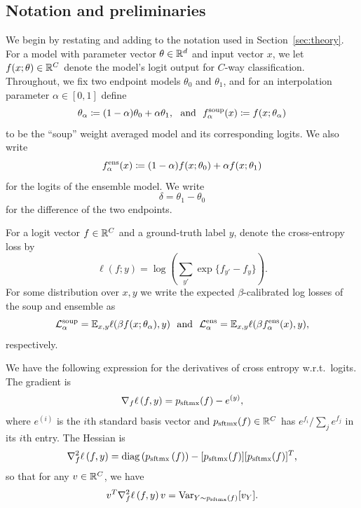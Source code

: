 \newcommand{\ones}{\mathbf{1}}
\newcommand{\sbv}[1]{e^{(#1)}}

\subsection{Notation and preliminaries}
We begin by restating and adding to the notation used in Section~\ref{sec:theory}.
For a model with parameter vector $\theta\in\mathbb{R}^d$ and input vector $x$, we let $f(x;\theta)\in\mathbb{R}^C$ denote the model's logit output for $C$-way classification. Throughout, we fix two endpoint models $\theta_0$ and $\theta_1$, and for an interpolation parameter $\alpha\in[0,1]$ define
\begin{equation*}
	\theta_\alpha \coloneqq (1-\alpha) \theta_0 + \alpha \theta_1,
	~~\mbox{and}~~
	f_\alpha^{\mathrm{soup}}(x) \coloneqq f(x; \theta_\alpha)
\end{equation*}
to be the ``soup'' weight averaged model and its corresponding logits. We also write
\begin{equation*}
	f_\alpha^{\mathrm{ens}}(x) \coloneqq (1-\alpha)f(x;\theta_0) + \alpha f(x;\theta_1)
\end{equation*}
for the logits of the ensemble model. We write
\begin{equation*}
	\delta = \theta_1 - \theta_0
\end{equation*}
for the difference of the two endpoints.

For a logit vector $f\in\mathbb{R}^C$ and a ground-truth label $y$, denote the cross-entropy loss by
\begin{equation*}
	\ell(f;y) = \log\left(\sum_{y'}\exp\{f_{y'}-f_{y}\}\right).
\end{equation*}
For some distribution over $x,y$ we write the expected $\beta$-calibrated log losses of the soup and ensemble as
\begin{equation*}
	\mathcal{L}^{\mathrm{soup}}_\alpha = \mathbb{E}_{x,y} \ell(\beta f(x;\theta_\alpha),y)
	~~\mbox{and}~~
	\mathcal{L}^{\mathrm{ens}}_\alpha = \mathbb{E}_{x,y} \ell(\beta f_\alpha^{\mathrm{ens}}(x),y),
\end{equation*}
respectively.

We have the following expression for the derivatives of cross entropy w.r.t.\ logits. The gradient is
\[
\grad_{f}\ell\left(f,y\right)=\softmax(f) - \sbv{y},
\]
where $\sbv{i}$ is the $i$th standard basis vector and $p_\mathrm{sftmx}(f)\in\mathbb{R}^C$ has $e^{f_i}/\sum_j e^{f_j}$ in its $i$th entry. The Hessian is
\[
\nabla^{2}_{f}\ell\left(f,y\right)=\mathrm{diag}\left(p_\mathrm{sftmx}\left(f\right)\right)
-
[p_\mathrm{sftmx}(f)] [p_\mathrm{sftmx}(f)]^T,
\]
so that for any $v\in \mathbb{R}^C$, we have
\begin{equation*}
	v^T \nabla^{2}_{f}\ell\left(f,y\right) v = \mathrm{Var}_{Y\sim p_\mathrm{sftmx}(f)} [v_Y].
\end{equation*}

